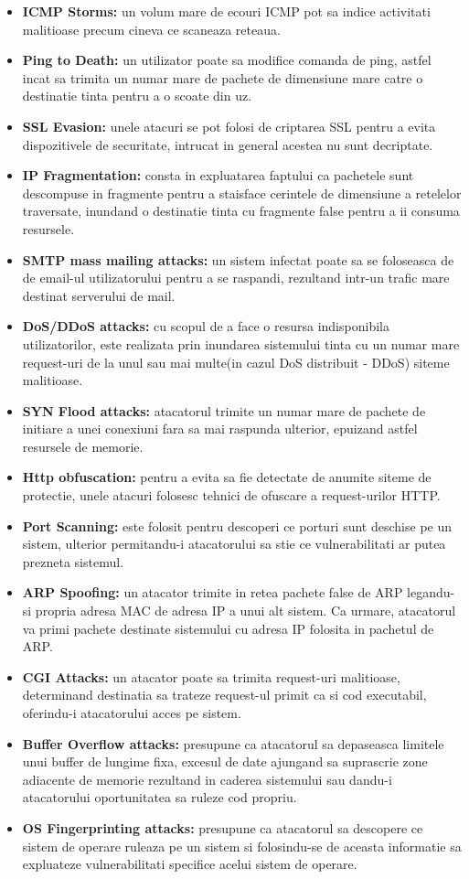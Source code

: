 \begin{itemize}
	\item \textbf{ICMP Storms:} un volum mare de ecouri ICMP pot sa indice activitati malitioase precum cineva ce scaneaza reteaua.
	\item \textbf{Ping to Death:} un utilizator poate sa modifice comanda de ping, astfel incat sa trimita un numar mare de pachete de dimensiune mare catre o destinatie tinta pentru a o scoate din uz.
	\item \textbf{SSL Evasion:} unele atacuri se pot folosi de criptarea SSL pentru a evita dispozitivele de securitate, intrucat in general acestea nu sunt decriptate.
	\item \textbf{IP Fragmentation:} consta in expluatarea faptului ca pachetele sunt descompuse in fragmente pentru a staisface cerintele de dimensiune a retelelor traversate, inundand o destinatie tinta cu fragmente false pentru a ii consuma resursele. 
	\item \textbf{SMTP mass mailing attacks:} un sistem infectat poate sa se foloseasca de de email-ul utilizatorului pentru a se raspandi, rezultand intr-un trafic mare destinat serverului de mail.
	\item \textbf{DoS/DDoS attacks:} cu scopul de a face o resursa indisponibila utilizatorilor, este realizata prin inundarea sistemului tinta cu un numar mare request-uri de la unul sau mai multe(in cazul DoS distribuit - DDoS) siteme malitioase.
	\item \textbf{SYN Flood attacks:} atacatorul trimite un numar mare de pachete de initiare a unei conexiuni fara sa mai raspunda ulterior, epuizand astfel resursele de memorie.
	\item \textbf{Http obfuscation:} pentru a evita sa fie detectate de anumite siteme de protectie, unele atacuri folosesc tehnici de ofuscare a request-urilor HTTP.
	\item \textbf{Port Scanning:} este folosit pentru descoperi ce porturi sunt deschise pe un sistem, ulterior permitandu-i atacatorului sa stie ce vulnerabilitati ar putea prezneta sistemul.
	\item \textbf{ARP Spoofing:} un atacator trimite in retea pachete false de ARP legandu-si propria adresa MAC de adresa IP a unui alt sistem. Ca urmare, atacatorul va primi pachete destinate sistemului cu adresa IP folosita in pachetul de ARP.
	\item \textbf{CGI Attacks:} un atacator poate sa trimita request-uri malitioase, determinand destinatia sa trateze request-ul primit ca si cod executabil, oferindu-i atacatorului acces pe sistem.
	\item \textbf{Buffer Overflow attacks:} presupune ca atacatorul sa depaseasca limitele unui buffer de lungime fixa, excesul de date ajungand sa suprascrie zone adiacente de memorie rezultand in caderea sistemului sau dandu-i atacatorului oportunitatea sa ruleze cod propriu.
	\item \textbf{OS Fingerprinting attacks:} presupune ca atacatorul sa descopere ce sistem de operare ruleaza pe un sistem si folosindu-se de aceasta informatie sa expluateze vulnerabilitati specifice acelui sistem de operare.
\end{itemize}


